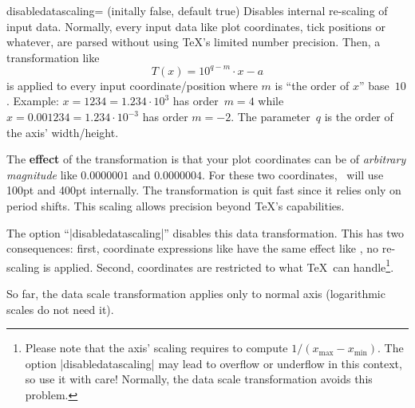 \label{sec:disabledatascaling}%
\begin{pgfplotskey}{disabledatascaling= (initally false, default true)}
Disables internal re-scaling of input data. Normally, every input data like plot coordinates, tick positions or whatever, are parsed without using \TeX's limited number precision. Then, a transformation like 
	\[ T(x) = 10^{q-m} \cdot x - a \]
is applied to every input coordinate/position where $m$ is ``the order of $x$'' base~$10$. Example: $x=1234 = 1.234\cdot 10^3$ has order~$m=4$ while $x=0.001234 = 1.234\cdot 10^{-3}$ has order $m=-2$. The parameter~$q$ is the order of the axis' width/height.

The \textbf{effect} of the transformation is that your plot coordinates can be of \emph{arbitrary magnitude} like $0.0000001$ and $0.0000004$. For these two coordinates, \PGFPlots\ will use 100pt and 400pt internally. The transformation is quit fast since it relies only on period shifts. This scaling allows precision beyond \TeX's capabilities.

The option ``|disabledatascaling|'' disables this data transformation. This has two consequences: first, coordinate expressions like  have the same effect like , no re-scaling is applied. Second, coordinates are restricted to what \TeX\ can handle\footnote{Please note that the axis' scaling requires to compute $1/( x_\text{max} - x_{\text{min}} )$. The option |disabledatascaling| may lead to overflow or underflow in this context, so use it with care! Normally, the data scale transformation avoids this problem.}.

So far, the data scale transformation applies only to normal axis (logarithmic scales do not need it). 
\end{pgfplotskey}


